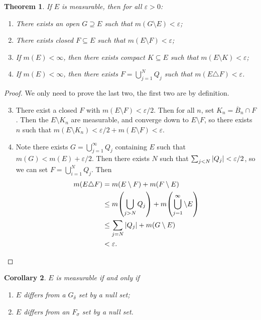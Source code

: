 \documentclass[leqno, openany]{memoir}
\newtheorem{thm}{Theorem}[chapter]
\newtheorem{cor}[thm]{Corollary}
\theoremstyle{definition}
\theoremstyle{remark}
\theoremstyle{plain}
\theoremstyle{definition}
\theoremstyle{remark}
\newcommand{\ep}{\varepsilon}
\newcommand{\ol}[1]{\overline{#1}}
\begin{document}
\begin{thm}
    If $E$ is measurable, then for all $\ep > 0$:
    \begin{enumerate}
        \item There exists an open $G \supseteq E$ such that $m(G \setminus E) < \ep$;
        \item There exists closed $F \subseteq E$ such that $m(E \setminus F) < \ep$;
        \item If $m(E) < \infty$, then there exists compact $K \subseteq E$ such that $m(E \setminus K) < \ep$;
        \item If $m(E) < \infty$, then there exists $F = \bigcup_{j=1}^N Q_j$ such that $m(E \triangle F) < \ep$.
    \end{enumerate}
\end{thm}

\begin{proof}
    We only need to prove the last two, the first two are by definition.
    \begin{enumerate}
        \setcounter{enumi}{2}
        \item There exist a closed $F$ with $m(E \setminus F) < \ep / 2$. Then for all $n$, set $K_n = \ol{B}_n \cap F$. Then the $E \setminus K_n$ are measurable, and converge down to $E \setminus F$, so there exists $n$ such that $m(E \setminus K_n) < \ep/2 + m(E \setminus F) < \ep$.
        \item Note there exists $G = \bigcup_{j=1}^{\infty} Q_j$ containing $E$ such that $m(G) < m(E) + \ep/2$. Then there exists $N$ such that $\sum_{j < N} \abs{Q_j} < \ep/2$, so we can set $F = \bigcup_{i=1}^N Q_j$. Then
            \begin{align*}
                m(E \triangle F) &= m(E \setminus F) + m(F \setminus E) \\
                                 &\leq m\qty(\bigcup_{j>N} Q_j) + m\qty(\bigcup_{j=1}^{\infty} \setminus E) \\
                                 &\leq \sum_{j=N} \abs{Q_j} + m(G \setminus E) \\
                                 &< \ep. \qedhere
            \end{align*}
    \end{enumerate}
\end{proof}

\begin{cor}
    $E$ is measurable if and only if
    \begin{enumerate}
        \item $E$ differs from a $G_{\delta}$ set by a null set;
        \item $E$ differs from an $F_{\sigma}$ set by a null set.
    \end{enumerate}
\end{cor}
\end{document}

